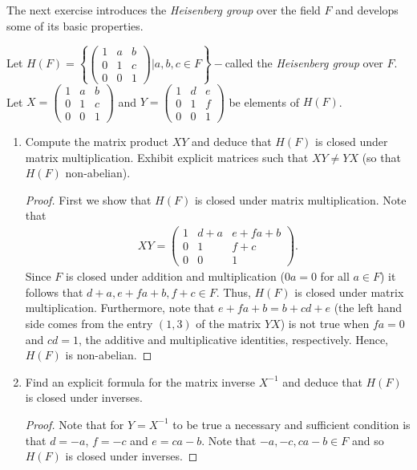 \documentclass[12pt]{article}
\newenvironment{problem}[2][Problem]{\begin{trivlist} \item[\hskip \labelsep {\bfseries #1}\hskip \labelsep {\bfseries #2.}]}{\end{trivlist}}
\begin{document}
The next exercise introduces the \textit{Heisenberg group} over the field $F$ and develops some of its basic properties.
\begin{problem}{11}
  Let $H(F)=\left\{ \begin{pmatrix}1 & a & b\\ 0 & 1 & c\\ 0 & 0 & 1\end{pmatrix} | a,b,c\in F\right\}-$called the \textit{Heisenberg group} over $F$. Let $X=\begin{pmatrix}1 & a & b\\ 0 & 1 & c\\ 0 & 0 & 1\end{pmatrix}$ and $Y=\begin{pmatrix}1 & d & e \\ 0 & 1 & f\\ 0 & 0 & 1\end{pmatrix}$ be elements of $H(F)$.
\begin{enumerate}
  \item Compute the matrix product $XY$ and deduce that $H(F)$ is closed under matrix multiplication. Exhibit explicit matrices such that $XY\neq YX$ (so that $H(F)$ non-abelian).
\begin{proof}
  First we show that $H(F)$ is closed under matrix multiplication. Note that
\begin{align*}
  XY = \begin{pmatrix} 1 & d+a & e + fa+b \\ 0 & 1 & f + c \\ 0 & 0 & 1\end{pmatrix}.
\end{align*}
Since $F$ is closed under addition and multiplication ($0a=0$ for all $a\in F$) it follows that $d+a,e+fa+b,f+c\in F$. Thus, $H(F)$ is closed under matrix multiplication. Furthermore, note that $e+fa+b = b+cd+e$ (the left hand side comes from the entry $(1,3)$ of the matrix $YX$) is not true when $fa=0$ and $cd=1$, the additive and multiplicative identities, respectively. Hence, $H(F)$ is non-abelian.
\end{proof}
  \item Find an explicit formula for the matrix inverse $X^{-1}$ and deduce that $H(F)$ is closed under inverses.
\begin{proof}
   Note that for $Y=X^{-1}$ to be true a necessary and sufficient condition is that $d=-a$, $f=-c$ and $e=ca-b$. Note that $-a,-c,ca-b\in F$ and so $H(F)$ is closed under inverses. 
\end{proof}

\end{enumerate}
\end{problem}
\end{document}
